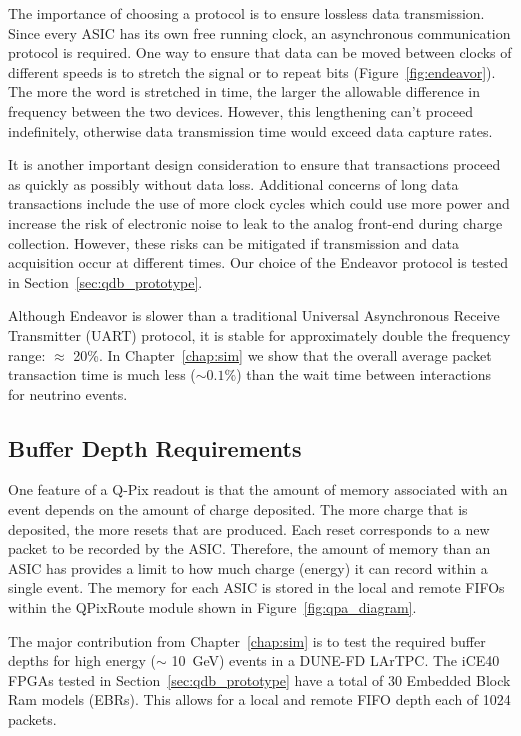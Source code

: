 The importance of choosing a protocol is to ensure lossless data transmission.
Since every ASIC has its own free running clock, an asynchronous communication protocol is required.
One way to ensure that data can be moved between clocks of different speeds is to stretch the signal or to repeat bits (Figure~\ref{fig:endeavor}).
The more the word is stretched in time, the larger the allowable difference in frequency between the two devices.
However, this lengthening can't proceed indefinitely, otherwise data transmission time would exceed data capture rates.

It is another important design consideration to ensure that transactions proceed as quickly as possibly without data loss.
Additional concerns of long data transactions include the use of more clock cycles which could use more power and increase the risk of electronic noise to leak to the analog front-end during charge collection.
However, these risks can be mitigated if transmission and data acquisition occur at different times.
Our choice of the Endeavor protocol is tested in Section~\ref{sec:qdb_prototype}.

Although Endeavor is slower than a traditional Universal Asynchronous Receive Transmitter (UART) protocol, it is stable for approximately double the frequency range: $\approx$ 20\%.
In Chapter~\ref{chap:sim} we show that the overall average packet transaction time is much less ($\sim 0.1\%$) than the wait time between interactions for neutrino events.

\subsection{Buffer Depth Requirements}\label{sec:buffer_requirements}
One feature of a Q-Pix readout is that the amount of memory associated with an event depends on the amount of charge deposited.
The more charge that is deposited, the more resets that are produced.
Each reset corresponds to a new packet to be recorded by the ASIC.
Therefore, the amount of memory than an ASIC has provides a limit to how much charge (energy) it can record within a single event.
The memory for each ASIC is stored in the local and remote FIFOs within the QPixRoute module shown in Figure~\ref{fig:qpa_diagram}.

The major contribution from Chapter~\ref{chap:sim} is to test the required buffer depths for high energy ($\sim$ 10~\unit{GeV}) events in a DUNE-FD LArTPC.
The iCE40 FPGAs tested in Section~\ref{sec:qdb_prototype} have a total of 30 Embedded Block Ram models (EBRs).
This allows for a local and remote FIFO depth each of 1024 packets.

